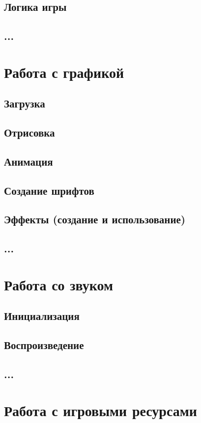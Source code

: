 \section{Логика игры}
\section{...}

\chapter{Работа с графикой} %
\section{Загрузка}
\section{Отрисовка}
\section{Анимация}
\section{Создание шрифтов}
\section{Эффекты (создание и использование)}
\section{...}

\chapter{Работа со звуком} %
\section{Инициализация}
\section{Воспроизведение}
\section{...}

\chapter{Работа с игровыми ресурсами}

